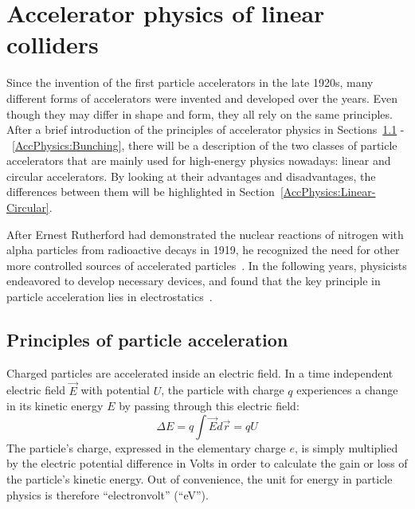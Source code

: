 \chapter{Accelerator physics of linear colliders}
\label{LinearColliderPhysics}

\begin{chapterabstract}
Since the invention of the first particle accelerators in the late 1920s, many different forms of accelerators were invented and developed over the years. 
Even though they may differ in shape and form, they all rely on the same principles. 
After a brief introduction of the principles of accelerator physics in Sections~\ref{AccPhysics:Principles} -~\ref{AccPhysics:Bunching}, there will be a description of the two classes of particle accelerators that are mainly used for high-energy physics nowadays: linear and circular accelerators. 
By looking at their advantages and disadvantages, the differences between them will be highlighted in Section~\ref{AccPhysics:Linear-Circular}.
\end{chapterabstract}
\vspace*{0.5cm}\newline 
\noindent
After Ernest Rutherford had demonstrated the nuclear reactions of nitrogen with alpha particles from radioactive decays in 1919, he recognized the need for other more controlled sources of accelerated particles~\cite{Rutherford}.
In the following years, physicists endeavored to develop necessary devices, and found that the key principle in particle acceleration lies in electrostatics~\cite[p. 3f]{Livingston}.

\section{Principles of particle acceleration}
\label{AccPhysics:Principles}
Charged particles are accelerated inside an electric field. 
In a time independent electric field $\vec{E}$ with potential $U$, the particle with charge $q$ experiences a change in its kinetic energy $E$ by passing through this electric field:
\begin{equation}
 \Delta E = q \int \vec{E}d\vec{r} = qU
\end{equation}
The particle's charge, expressed in the elementary charge $e$, is simply multiplied by the electric potential difference in Volts in order to calculate the gain or loss of the particle's kinetic energy. 
Out of convenience, the unit for energy in particle physics is therefore ``electronvolt'' (``eV'').

